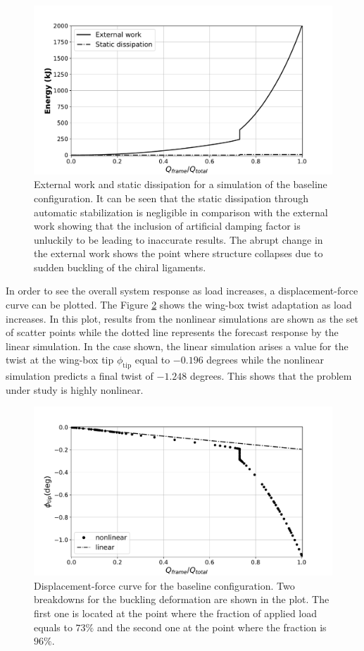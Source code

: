   \begin{figure}[!htpb] %
    \centering
    \includegraphics[width=0.8 \textwidth]{figures/result-sim/energy}
    \caption[External work and static dissipation for a simulation of the baseline configuration]{External work and static dissipation for a simulation of the baseline configuration. It can be seen that the static dissipation through automatic stabilization is negligible in comparison with the external work showing that the inclusion of artificial damping factor is unluckily to be leading to inaccurate results. The abrupt change in the external work shows the point where structure collapses due to sudden buckling of the chiral ligaments.}\label{fig:energy}
  \end{figure}

  In order to see the overall system response as load increases, a displacement-force curve can be plotted. The Figure \ref{fig:forceDisplacement-far} shows the wing-box twist adaptation as load increases. In this plot, results from the nonlinear simulations are shown as the set of scatter points while the dotted line represents the forecast response by the linear simulation. In the case shown, the linear simulation arises a value for the twist at the wing-box tip $\phi_{\mathrm{tip}}$ equal to $-0.196$ degrees while the nonlinear simulation predicts a final twist of $-1.248$ degrees. This shows that the problem under study is highly nonlinear.

  \begin{figure}[!htpb] %
    \centering
    \includegraphics[width=0.8 \textwidth]{figures/result-sim/forceDisplacement-far}
    \caption[Displacement-force curve for the baseline configuration]{Displacement-force curve for the baseline configuration. Two breakdowns for the buckling deformation are shown in the plot. The first one is located at the point where the fraction of applied load equals to $73\%$ and the second one at the point where the fraction is $96\%$.}\label{fig:forceDisplacement-far}
  \end{figure}

